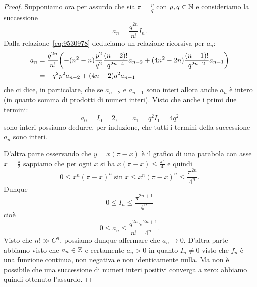 \begin{proof}
Supponiamo ora per assurdo che sia $\pi = \frac p q$ con $p,q\in \mathbb N$ e consideriamo
la successione
\[
   a_n = \frac{q^{2n}}{n!} I_n.
\]
Dalla relazione~\eqref{eq:9530978} deduciamo
un relazione ricorsiva per $a_n$:
\begin{align*}
  a_n &= \frac{q^{2n}}{n!}{\left( -(n^2-n)\frac{p^2}{q^2} \frac{(n-2)!}{q^{2n-4}}a_{n-2}
  + (4n^2-2n) \frac{(n-1)!}{q^{2n-2}}a_{n-1} \right)} \\
  &= - q^2 p^2 a_{n-2} + (4n-2)q^2 a_{n-1}
\end{align*}
che ci dice, in particolare, che se $a_{n-2}$ e $a_{n-1}$
sono interi allora anche $a_n$ è intero (in quanto somma di prodotti
di numeri interi).
Visto che anche i primi due termini:
\[
  a_0 = I_0 = 2, \qquad
  a_1 = q^2 I_1 = 4 q^2
\]
sono interi possiamo dedurre, per induzione, che
tutti i termini della successione $a_n$ sono interi.

D'altra parte osservando che $y=x(\pi-x)$
è il grafico di una parabola con asse $x=\frac \pi 2$
sappiamo che per ogni $x$ si ha $x(\pi-x) \le \frac{\pi^2}{4}$
e quindi
\[
  0 \le x^n(\pi-x)^n \sin x
    \le x^n (\pi-x)^n \le \frac{\pi^{2n}}{4^n}.
\]
Dunque
\[
  0 \le I_n \le \frac{\pi^{2n+1}}{4^n}
\]
cioè
\[
  0 \le a_n \le \frac{q^{2n}}{n!}\frac{\pi^{2n+1}}{4^n}.
\]
Visto che $n! \gg C^n$, possiamo dunque affermare che $a_n\to 0$.
D'altra parte abbiamo visto che
$a_n \in \mathbb Z$ e certamente $a_n > 0$ in quanto $I_n \neq 0$ visto che $f_n$ è
una funzione continua, non negativa e non identicamente nulla.
Ma non è
possibile che una successione di numeri interi positivi converga a zero:
abbiamo quindi ottenuto l'assurdo.
\end{proof}

